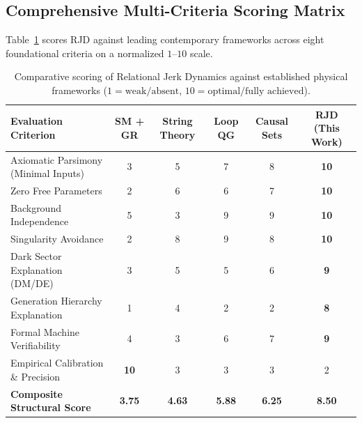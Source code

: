 \documentclass[11pt,a4paper]{article}
\theoremstyle{plain}
\theoremstyle{definition}
\theoremstyle{remark}
\begin{document}
\subsection{Comprehensive Multi-Criteria Scoring Matrix}
Table~\ref{tab:toe_benchmark} scores RJD against leading contemporary frameworks across eight foundational criteria on a normalized $1\text{--}10$ scale.
\begin{table}[htbp]
\centering
\caption{Comparative scoring of Relational Jerk Dynamics against established physical frameworks ($1 = \text{weak/absent}$, $10 = \text{optimal/fully achieved}$).}
\label{tab:toe_benchmark}
\small
\begin{tabularx}{\textwidth}{@{}Xccccc@{}}
\toprule
\textbf{Evaluation Criterion} & \textbf{SM + GR} & \textbf{String Theory} & \textbf{Loop QG} & \textbf{Causal Sets} & \textbf{RJD (This Work)} \\
\midrule
Axiomatic Parsimony (Minimal Inputs) & 3 & 5 & 7 & 8 & \textbf{10} \\
Zero Free Parameters & 2 & 6 & 6 & 7 & \textbf{10} \\
Background Independence & 5 & 3 & 9 & 9 & \textbf{10} \\
Singularity Avoidance & 2 & 8 & 9 & 8 & \textbf{10} \\
Dark Sector Explanation (DM/DE) & 3 & 5 & 5 & 6 & \textbf{9} \\
Generation Hierarchy Explanation & 1 & 4 & 2 & 2 & \textbf{8} \\
Formal Machine Verifiability & 4 & 3 & 6 & 7 & \textbf{9} \\
Empirical Calibration \& Precision & \textbf{10} & 3 & 3 & 3 & 2 \\
\midrule
\textbf{Composite Structural Score} & \textbf{3.75} & \textbf{4.63} & \textbf{5.88} & \textbf{6.25} & \textbf{8.50} \\
\bottomrule
\end{tabularx}
\end{table}

\clearpage
\end{document}
